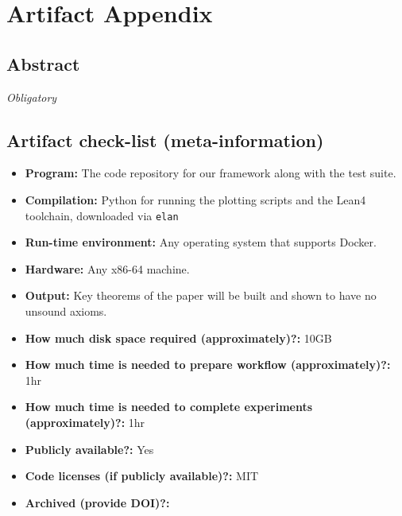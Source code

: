 \documentclass{sigplanconf}
\begin{document}


\appendix
\section{Artifact Appendix}

\subsection{Abstract}

{\em Obligatory}

\subsection{Artifact check-list (meta-information)}


{\small
\begin{itemize}
  \item {\bf Program: } The code repository for our framework along with the test suite.
  \item {\bf Compilation: } Python for running the plotting scripts and the Lean4 toolchain, downloaded via \texttt{elan}
  \item {\bf Run-time environment: } Any operating system that supports Docker.
  \item {\bf Hardware: } Any x86-64 machine.
  \item {\bf Output: } Key theorems of the paper will be built and shown to have no unsound axioms.
  \item {\bf How much disk space required (approximately)?: } 10GB
  \item {\bf How much time is needed to prepare workflow (approximately)?: } 1hr
  \item {\bf How much time is needed to complete experiments (approximately)?: } 1hr
  \item {\bf Publicly available?: } Yes
  \item {\bf Code licenses (if publicly available)?: } MIT
  \item {\bf Archived (provide DOI)?: }
\end{itemize}
}
\end{document}
